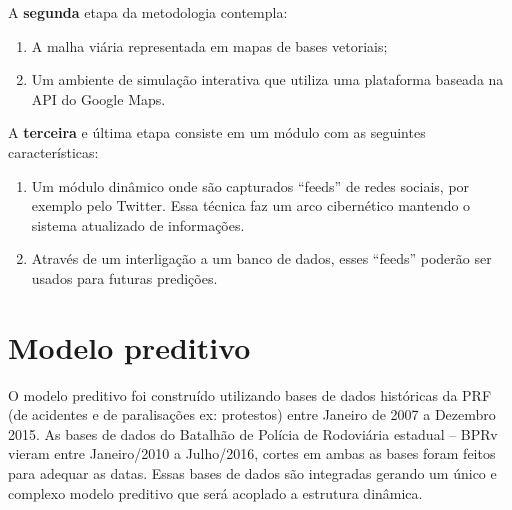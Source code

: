 A \textbf{segunda} etapa da metodologia contempla:
 \begin{enumerate}
    \item A malha viária representada em mapas de bases vetoriais;
    \item Um ambiente de simulação interativa que utiliza uma plataforma baseada na API do Google Maps.
  \end{enumerate}

A \textbf{terceira} e última etapa consiste em um módulo com as seguintes características:
  \begin{enumerate}
     \item Um módulo dinâmico onde são capturados ``feeds'' de redes sociais, por exemplo pelo Twitter. 
	Essa técnica faz um arco cibernético mantendo o sistema atualizado de informações.
     \item Através de um interligação a um banco de dados, esses ``feeds'' poderão ser usados para futuras predições.
  \end{enumerate}


\pagebreak


\section{Modelo preditivo}

O modelo preditivo foi construído utilizando bases de dados históricas da PRF (de acidentes e de paralisações ex: protestos) entre Janeiro de 2007 a 
Dezembro 2015. As bases de dados do Batalhão de Polícia de Rodoviária estadual -- BPRv vieram entre Janeiro/2010 a Julho/2016, cortes em ambas as bases foram 
feitos para adequar as datas. Essas bases de dados são integradas gerando um único e complexo modelo preditivo que será acoplado a estrutura dinâmica.


